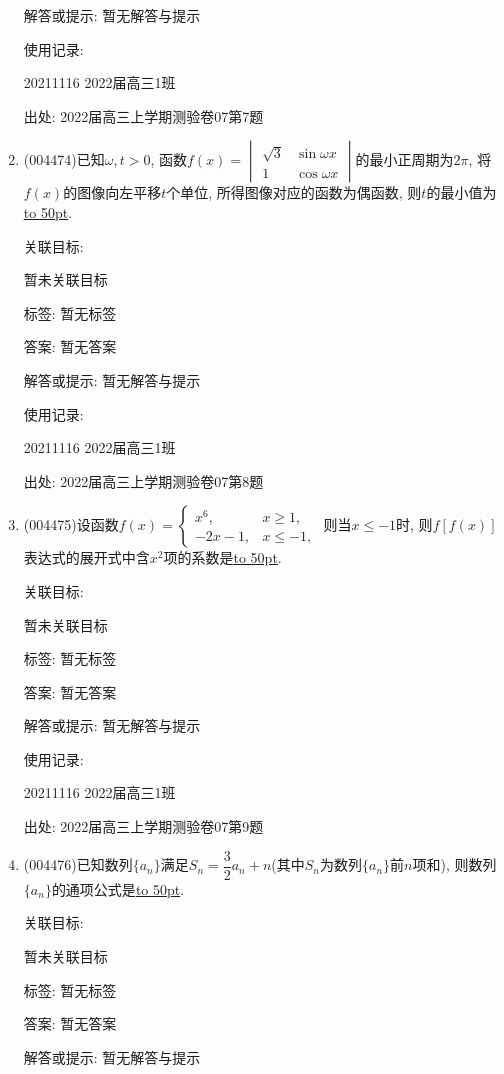 \documentclass[10pt,a4paper]{article}
\newcommand{\blank}[1]{\underline{\hbox to #1pt{}}}
\begin{document}
\begin{enumerate}[1.]
解答或提示: 暂无解答与提示

使用记录:

20211116	2022届高三1班	


出处: 2022届高三上学期测验卷07第7题
\item { (004474)}已知$\omega,t>0$, 函数$f(x)=\begin{vmatrix}
\sqrt 3 & \sin \omega x  \\ 1  & \cos \omega x  \end{vmatrix}$的最小正周期为$2\pi$, 将$f(x)$的图像向左平移$t$个单位, 所得图像对应的函数为偶函数, 则$t$的最小值为\blank{50}.


关联目标:

暂未关联目标



标签: 暂无标签

答案: 暂无答案

解答或提示: 暂无解答与提示

使用记录:

20211116	2022届高三1班	


出处: 2022届高三上学期测验卷07第8题
\item { (004475)}设函数$f(x)=\begin{cases} x^6, &  x\ge 1,  \\ -2x-1, &  x\le -1,  \end{cases}$ 则当$x\le -1$时, 则$f[f(x)]$表达式的展开式中含$x^2$项的系数是\blank{50}.


关联目标:

暂未关联目标



标签: 暂无标签

答案: 暂无答案

解答或提示: 暂无解答与提示

使用记录:

20211116	2022届高三1班	


出处: 2022届高三上学期测验卷07第9题
\item { (004476)}已知数列$\{a_n\}$满足$S_n=\dfrac32a_n+n$(其中$S_n$为数列$\{a_n\}$前$n$项和), 则数列$\{a_n\}$的通项公式是\blank{50}.


关联目标:

暂未关联目标



标签: 暂无标签

答案: 暂无答案

解答或提示: 暂无解答与提示


\end{enumerate}
\end{document}
